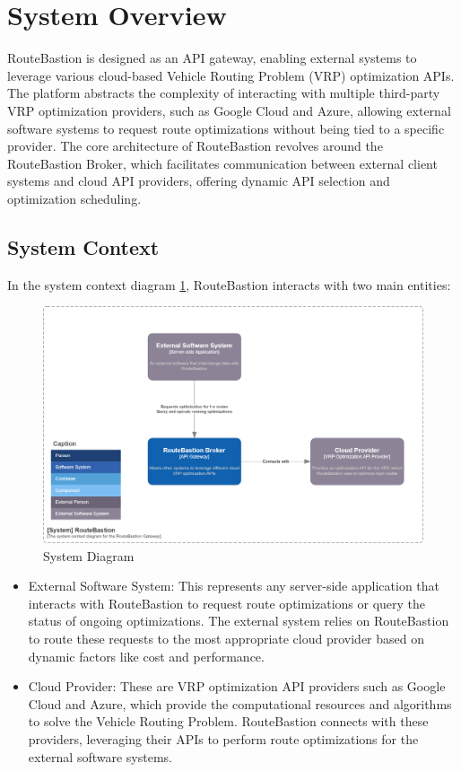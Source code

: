 \documentclass[english,notblind]{sbc20}
\begin{document}
\section{System Overview}
\label{sec:system_overview}
RouteBastion is designed as an API gateway, enabling external systems to leverage various cloud-based Vehicle Routing Problem (VRP) optimization APIs. The platform abstracts the complexity of interacting with multiple third-party VRP optimization providers, such as Google Cloud and Azure, allowing external software systems to request route optimizations without being tied to a specific provider. The core architecture of RouteBastion revolves around the RouteBastion Broker, which facilitates communication between external client systems and cloud API providers, offering dynamic API selection and optimization scheduling.

\subsection{System Context}
\label{subsec:system_context}
In the system context diagram \ref{fig:system}, RouteBastion interacts with two main entities:

\begin{figure}
  \includegraphics[width=\columnwidth]{figures/c4_diagrams/System.png}
  \caption{System Diagram\label{fig:system}}
\end{figure}

\begin{itemize}
  \item External Software System: This represents any server-side application that interacts with RouteBastion to request route optimizations or query the status of ongoing optimizations. The external system relies on RouteBastion to route these requests to the most appropriate cloud provider based on dynamic factors like cost and performance.

  \item Cloud Provider: These are VRP optimization API providers such as Google Cloud and Azure, which provide the computational resources and algorithms to solve the Vehicle Routing Problem. RouteBastion connects with these providers, leveraging their APIs to perform route optimizations for the external software systems.
\end{itemize}
\end{document}
